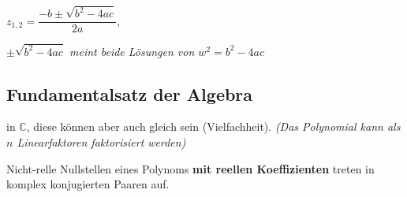 $z_{1,2} = \dfrac{-b \pm \sqrt{b^2 - 4ac}}{2a}$, 

\textit{$\pm \sqrt{b^2 - 4ac}$ meint beide Lösungen von $w^2 = b^2 - 4ac$}

\subsection{Fundamentalsatz der Algebra}
 in $\mathbb{C}$, diese können aber auch gleich sein (Vielfachheit). 
\textit{(Das Polynomial kann als $n$ Linearfaktoren faktorisiert werden)}

Nicht-relle Nullstellen eines Polynoms \textbf{mit reellen Koeffizienten} treten in komplex konjugierten Paaren auf.
